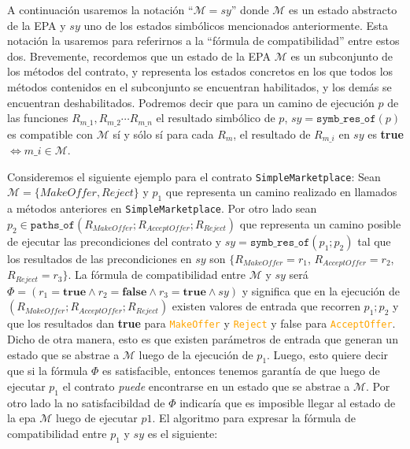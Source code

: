 A continuación usaremos la notación ``$\mathcal{M}=sy$'' donde $\mathcal{M}$ es un estado abstracto de la EPA y $sy$ uno de los estados simbólicos mencionados anteriormente.
Esta notación la usaremos para referirnos a la ``fórmula de compatibilidad'' entre estos dos.
Brevemente, recordemos que un estado de la EPA $\mathcal{M}$ es un subconjunto de los métodos del contrato, y representa los estados concretos en los que todos los métodos contenidos en el subconjunto se encuentran habilitados, y los demás se encuentran deshabilitados.
Podremos decir que para un camino de ejecución $p$ de las funciones $R_{m\_1},R_{m\_2} \cdots R_{m\_n}$ el resultado simbólico de $p$, $sy = \texttt{symb\_res\_of}(p)$ es compatible con $\mathcal{M}$ sí y sólo sí para cada $R_m$, el resultado de $R_{m\_i}$ en $sy$ es \textbf{true} $\iff m\_i \in \mathcal{M}$.

Consideremos el siguiente ejemplo para el contrato \texttt{SimpleMarketplace}:
Sean $\mathcal{M} = \{MakeOffer, Reject\}$ y $p_1$ que representa un camino realizado en llamados a métodos anteriores en \texttt{SimpleMarketplace}.
Por otro lado sean $p_2 \in \texttt{paths\_of}(R_{MakeOffer}; R_{AcceptOffer}; R_{Reject})$ que representa un camino posible de ejecutar las precondiciones del contrato y $sy = \texttt{symb\_res\_of}(p_1;p_2)$ tal que los resultados de las precondiciones en $sy$ son $\{R_{MakeOffer} = r_1$, $R_{AcceptOffer} = r_2$, $R_{Reject} = r_3\}$.
La fórmula de compatibilidad entre $\mathcal{M}$ y $sy$ será $\Phi = (r_1 = \textbf{true} \land r_2 = \textbf{false} \land r_3 = \textbf{true} \land sy)$ y significa que en la ejecución de $(R_{MakeOffer}; R_{AcceptOffer}; R_{Reject})$ existen valores de entrada que recorren $p_1;p_2$ y que los resultados dan \textbf{true} para \textcolor{orange}{\texttt{MakeOffer}} y \textcolor{orange}{\texttt{Reject}} y false para \textcolor{orange}{\texttt{AcceptOffer}}.
Dicho de otra manera, esto es que existen parámetros de entrada que generan un estado que se abstrae a $\mathcal{M}$ luego de la ejecución de $p_1$.
Luego, esto quiere decir que si la fórmula $\Phi$ es satisfacible, entonces tenemos garantía de que luego de ejecutar $p_1$ el contrato \textit{puede} encontrarse en un estado que se abstrae a $\mathcal{M}$.
Por otro lado la no satisfacibildad de $\Phi$ indicaría que es imposible llegar al estado de la epa $\mathcal{M}$ luego de ejecutar $p1$.
El algoritmo para expresar la fórmula de compatibilidad entre $p_1$ y $sy$ es el siguiente:

